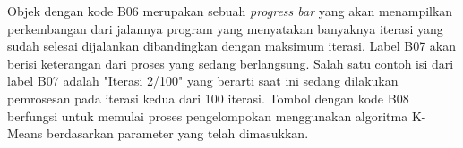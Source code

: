 Objek dengan kode B06 merupakan sebuah \textit{progress bar} yang akan menampilkan perkembangan dari jalannya program yang menyatakan banyaknya iterasi yang sudah selesai dijalankan dibandingkan dengan maksimum iterasi. Label B07 akan berisi keterangan dari proses yang sedang berlangsung. Salah satu contoh isi dari label B07 adalah "Iterasi 2/100" yang berarti saat ini sedang dilakukan pemrosesan pada iterasi kedua dari 100 iterasi. Tombol dengan kode B08 berfungsi untuk memulai proses pengelompokan menggunakan algoritma K-Means berdasarkan parameter yang telah dimasukkan.
